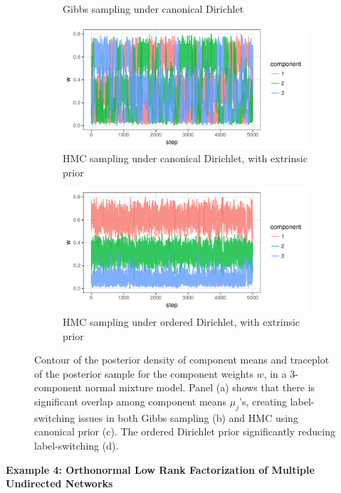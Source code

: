 \documentclass[10pt]{article}
\DeclareMathOperator{\1}{\mathbbm{1}}
\begin{document}
\begin{figure}[H]
\begin{subfigure}[b]{0.32\textwidth}
    \caption{Gibbs sampling under canonical Dirichlet}
    \end{subfigure}
       \begin{subfigure}[b]{0.32\textwidth}
  \includegraphics[width=1\textwidth]{fmm_w_hmc_unordered.pdf}
    \caption{HMC sampling under canonical Dirichlet, with extrinsic prior}
      \end{subfigure}
       \begin{subfigure}[b]{0.32\textwidth}
 \includegraphics[width=1\textwidth]{fmm_w_hmc.pdf}
     \caption{HMC sampling under ordered Dirichlet, with extrinsic prior}
     \end{subfigure}
\caption{Contour of the posterior density of component means and traceplot of the posterior sample for the component weights $w$, in a 3-component normal mixture model. Panel (a) shows that there is significant overlap among component means $\mu_j$'s, creating label-switching issues in both Gibbs sampling (b) and HMC using canonical prior (c). The ordered Dirichlet prior significantly reducing label-switching (d).}
\label{dirichlet}
\end{figure}


{\bf Example 4: Orthonormal Low Rank Factorization of Multiple Undirected Networks}
\end{document}
